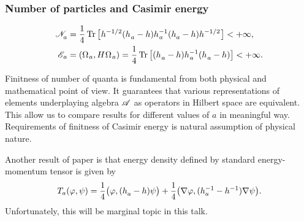 \documentclass[10pt,t]{beamer}
\begin{document}
\begin{frame}
  \frametitle{Number of particles and Casimir energy}

  \vspace{-2em}


  \begin{subequations}

    \begin{align}
      \label{eq:Construction-of-quasi-free-system-ETC-05-A}
      \mathcal{N}_{ a }^{ \vphantom{1} }
      &=
        \frac{ 1 }{ 4 } \operatorname{Tr}\big[ \hspace{0.05em} h^{ -1/2 } (
        h_{ \hspace{0.05em} a }^{ \vphantom{1} } - h )
        h_{ \hspace{0.05em} a }^{ -1 }
        ( h_{ a }^{ \vphantom{1} } - h ) h^{ -1/2 } \hspace{0.07em} \big]
        < +\infty, \\
      \label{eq:Construction-of-quasi-free-system-ETC-05-B}
      \mathcal{E}_{ \hspace{0.07em} a }
      &=
        ( \Omega_{ \hspace{0.07em} a }, H \hspace{0.05em} \Omega_{ \hspace{0.07em} a } ) =
        \frac{ 1 }{ 4 }
        \operatorname{Tr}\big[ ( h_{ \hspace{0.05em} a }^{ \vphantom{1} } - h )
        h_{ \hspace{0.05em} a }^{ -1 }
        ( h_{ \hspace{0.05em} a }^{ \vphantom{1} } - h ) \big] < +\infty.
    \end{align}

  \end{subequations}

  \vspace{-1.5em}



  Finitness of number of quanta is fundamental from both physical and
  mathematical point of view. It guarantees that various representations
  of elements underplaying algebra $\mathcal{A}$ as operators in Hilbert space are
  equivalent. This allow us to compare results for different values of $a$
  in meaningful way. Requirements of finitness of Casimir energy is natural
  assumption of physical nature.

  Another result of paper
  \parencite{Herdegen-Quantum-backreaction-ETC-Part-I-Pub-2005}
  is that energy density defined by standard energy-momentum tensor is
  given by
  \begin{equation}
    \label{eq:Construction-of-quasi-free-system-ETC-06}
    T_{ a }( \varphi, \psi ) =
    \frac{ 1 }{ 4 } \big( \varphi, ( h_{ a }^{ \vphantom{1} } - h ) \psi \big) +
    \frac{ 1 }{ 4 } \big( \nabla \varphi, ( h_{ a }^{ -1 } -
    h^{ -1 }_{ \vphantom{a} } ) \nabla \psi \big).
  \end{equation}
  Unfortunately, this will be marginal topic in this talk.

\end{frame}
\end{document}
